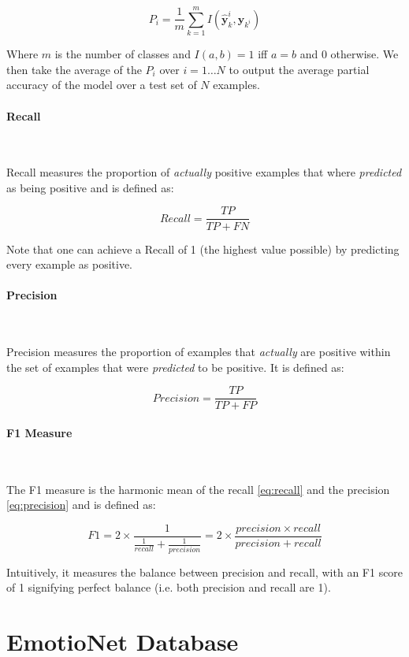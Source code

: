 \documentclass[12pt,twoside]{article}
\newcommand{\para}[1]{\paragraph{#1}\mbox{}\\}
\begin{document}
\begin{equation}
  P_i = \frac{1}{m}\sum_{k=1}^m I(\hat{\bm{y}}^i_k, \bm{y}_{k^i})
  \label{eq:partial_accuracy}
\end{equation}

Where $m$ is the number of classes and $I(a, b) = 1$ iff $a = b$ and 0
otherwise. We then take the average of the $P_i$ over $i=1\dots N$ to output the average
partial accuracy of the model over a test set of $N$ examples.


\para{Recall}\label{para:recall}

Recall measures the proportion of \textit{actually} positive examples that where
\textit{predicted} as being positive and is defined as:

\begin{equation}
  Recall = \frac{TP}{TP + FN}
  \label{eq:recall}
\end{equation}

Note that one can achieve a Recall of 1 (the highest value possible) by
predicting every example as positive.

\para{Precision}\label{para:precision}

Precision measures the proportion of examples that \textit{actually} are positive
within the set of examples that were \textit{predicted} to be positive. It is
defined as:

\begin{equation}
  Precision = \frac{TP}{TP + FP}
  \label{eq:precision}
\end{equation}

\para{F1 Measure}\label{para:f1_measure}

The F1 measure is the harmonic mean of the recall \eqref{eq:recall} and the
precision \eqref{eq:precision} and is defined as:

\begin{equation}
  F1 = 2\times \frac{1}{\frac{1}{recall}+\frac{1}{precision}} = 2 \times
  \frac{precision \times recall}{precision + recall} 
  \label{eq:F1}
\end{equation}

Intuitively, it measures the balance between precision and recall, with an F1
score of 1 signifying perfect balance (i.e. both precision and recall are 1).

\clearpage
\section{EmotioNet Database}
 
\end{document}
